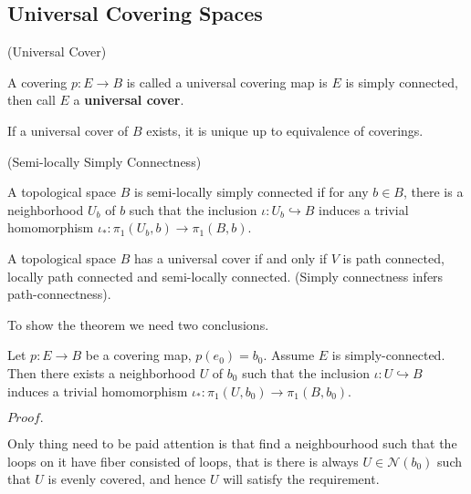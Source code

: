 \documentclass{article}
\newcommand{\Pf}[1]{$Proof.$\par}
\begin{document}
\subsection{Universal Covering Spaces}

\begin{definition}(Universal Cover)\par
    A covering $p:E\to B$ is called a universal covering map is $E$ is simply connected, then call $E$ a \textbf{universal cover}.
\end{definition}

\begin{corollary}
    If a universal cover of $B$ exists, it is unique up to equivalence of coverings.
\end{corollary}

\begin{definition}(Semi-locally Simply Connectness)\par
    A topological space $B$ is semi-locally simply connected if for any $b\in B$, there is a neighborhood $U_b$ of $b$ such that the inclusion $\iota: U_b \hookrightarrow B$ induces a trivial homomorphism $\iota_*: \pi_1(U_b,b) \to \pi_1(B,b)$.
\end{definition}

\begin{theorem}
    A topological space $B$ has a universal cover if and only if $V$ is path connected, locally path connected and semi-locally connected. (Simply connectness infers path-connectness).
\end{theorem}
To show the theorem we need two conclusions.

\begin{proposition}
    Let $p:E\to B$ be a covering map, $p(e_0) = b_0$. Assume $E$ is simply-connected. Then there exists a neighborhood $U$ of $b_0$ such that the inclusion $\iota:U\hookrightarrow B$ induces a trivial homomorphism $\iota_*:\pi_1(U,b_0) \to \pi_1(B,b_0)$.
\end{proposition}
\Pf\par
    Only thing need to be paid attention is that find a neighbourhood such that the loops on it have fiber consisted of loops, that is there is always $U \in \mathcal{N}(b_0)$ such that $U$ is evenly covered, and hence $U$ will satisfy the requirement.
\end{document}
